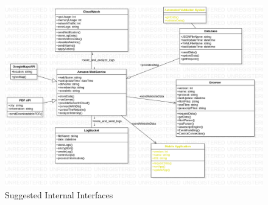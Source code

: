 \begin{figure}[H]
    \includegraphics[scale = 0.4]{assets/InternalInterfacesSuggestion.png}
    \caption[Suggested Internal Interfaces]{Suggested Internal Interfaces}
\end{figure}

